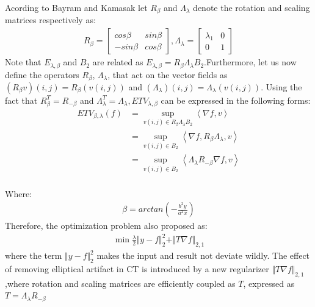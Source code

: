\documentclass[hyperref]{ctexart}
\begin{document}
{\begin{multicols}{2}
		Acording to Bayram and Kamasak let $R_\beta$ and $\Lambda_\lambda$ denote the rotation and scaling matrices respectively as:
		\begin{equation}
			\begin{split}
				R_{\beta} = \begin{bmatrix} cos\beta & sin\beta \\- sin\beta & cos\beta \end{bmatrix},\Lambda_{\lambda} = \begin{bmatrix} \lambda_1 & 0 \\ 0 & 1 \end{bmatrix}
			\end{split}
		\end{equation}
		Note that $E_{\lambda,\beta}$ and $B_2$ are related as $E_{\lambda,\beta} = R_\beta \Lambda_\lambda B_2$.Furthermore, let us now define the operators $R_\beta $, $\Lambda_\lambda$, that act on the vector fields as $(R_\beta v)(i,j) = R_\beta(v(i,j))$ and $(\Lambda_\lambda)(i,j) = \Lambda_\lambda(v(i,j))$. Using the fact that $R^T_\beta = R_{-\beta}$ and $\Lambda^T_\lambda = \Lambda_\lambda,ETV_{\lambda, \beta}$ can be expressed in the following forms:
		\begin{equation}
			\begin{split}
				ETV_{\beta,\lambda}(f)& =\mathop{sup}_{v(i,j)\in R_{\beta}\Lambda_{\lambda}B_2} \left \langle \nabla f,v \right \rangle \\
				& =\mathop{sup}_{v(i,j)\in B_2} \left \langle \nabla f,R_{\beta}\Lambda_{\lambda},v \right \rangle \\
				& =\mathop{sup}_{v(i,j)\in B_2} \left \langle \Lambda_\lambda R_{-\beta}\nabla f,v \right \rangle \\
			\end{split}
		\end{equation}
		
		Where:
		\begin{equation}
			\begin{split}
				\beta = arctan(-\frac{b^2 y}{a^2 x})
			\end{split}
		\end{equation}
		Therefore, the optimization problem also proposed as:
		\begin{equation}
			\begin{split}
				\min \frac{\lambda}{2} \Vert y-f\Vert_2^2 +  \Vert T \nabla f\Vert_{2,1}
			\end{split}
		\end{equation}
		where the term $\Vert y-f\Vert_2^2$ makes the input and result not deviate wildly. The effect of removing elliptical artifact in CT is introduced by a new regularizer $\Vert T \nabla f\Vert_{2,1}$,where rotation and scaling matrices are efficiently coupled as $T$, expressed as $T=\Lambda_\lambda R_{-\beta}$
		

\end{multicols}}
\end{document}
